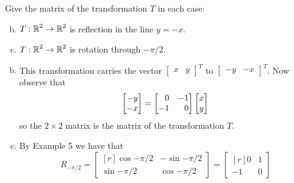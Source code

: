 \documentclass[../main.tex]{subfiles}
\begin{document}
Give the matrix of the transformation $T$ in each case:
\begin{enumerate}[a)]
	\setcounter{enumi}{1}
	\item $T: \operatorname{\mathbb{R}}^2 \to \operatorname{\mathbb{R}}^2$ is reflection in the line $y = -x$.
	\setcounter{enumi}{3}
	\item $T: \operatorname{\mathbb{R}}^2 \to \operatorname{\mathbb{R}}^2$ is rotation through $-\pi/2$.
\end{enumerate}

\solution
\begin{enumerate}[a)]
	\setcounter{enumi}{1}
	\item This transformation carries the vector $\begin{bmatrix}x&y\end{bmatrix}^T$ to $\begin{bmatrix}-y&-x\end{bmatrix}^T$. Now observe that
		\[
			\begin{bmatrix}-y\\-x\end{bmatrix}
			=
			\begin{bmatrix*}[r]0&-1\\-1&0\end{bmatrix*}
			\begin{bmatrix}x\\y\end{bmatrix} \\
		\]
		so the $2\times2$ matrix is the matrix of the transformation $T$.
	\setcounter{enumi}{3}
	\item By Example 5 we have that
		\[
			R_{-\pi/2} = 
			\begin{bmatrix*}[r]
				\cos{-\pi/2} & -\sin{-\pi/2} \\
				\sin{-\pi/2} & \cos{-\pi/2}
			\end{bmatrix*}
			=
			\begin{bmatrix*}[r]
				0 & 1 \\
				-1 & 0
			\end{bmatrix*}
		\]
\end{enumerate}
\end{document}
